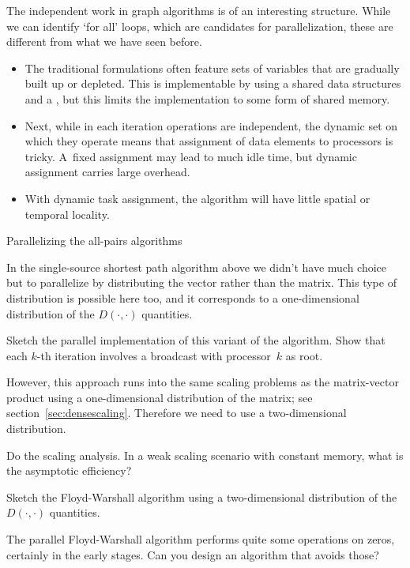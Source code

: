 The independent work in graph algorithms is of an interesting
structure.  While we can identify `for all' loops, which are
candidates for parallelization, these are different from what we have
seen before.
%
\begin{itemize}
\item The traditional formulations often feature sets of variables
  that are gradually built up or depleted. This is implementable by
  using a shared data structures and a , but this limits the
  implementation to some form of shared memory.
\item
  Next, while in each iteration operations are independent, the dynamic
  set on which they operate means that assignment of data
  elements to processors is tricky.
  A~fixed assignment may lead to much idle time, but dynamic
  assignment carries large overhead.
\item With dynamic task assignment, the algorithm
  will have little spatial or temporal locality.
\end{itemize}

 {Parallelizing the all-pairs algorithms}

In the single-source shortest path algorithm above we didn't have much
choice but to parallelize by distributing the vector rather than the
matrix.  This type of distribution is possible here too, and it
corresponds to a one-dimensional distribution of the $D(\cdot,\cdot)$
quantities.
\begin{exercise}
  Sketch the parallel implementation of this variant of the
  algorithm. Show that each $k$-th iteration involves a broadcast with
  processor~$k$ as root.
\end{exercise}
However, this approach runs into the same scaling problems as the
matrix-vector product using a one-dimensional distribution of the
matrix; see section~\ref{sec:densescaling}. Therefore we need to use a
two-dimensional distribution.
\begin{exercise}
  Do the scaling analysis. In a weak scaling scenario with constant memory, 
  what is the asymptotic efficiency?
\end{exercise}
\begin{exercise}
  Sketch the Floyd-Warshall algorithm using a two-dimensional
  distribution of the $D(\cdot,\cdot)$ quantities.
\end{exercise}
\begin{exercise}
  The parallel Floyd-Warshall algorithm performs quite some operations
  on zeros, certainly in the early stages. Can you design an algorithm
  that avoids those?
\end{exercise}

